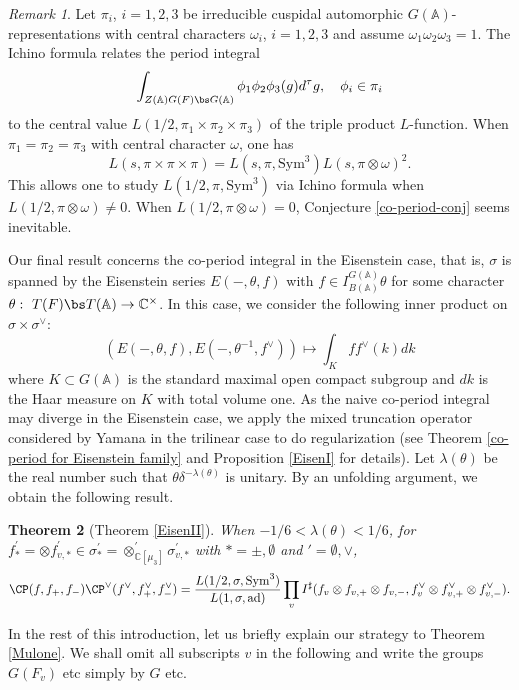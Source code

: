 \documentclass[11pt,reqno]{amsart}
\newcommand{\BA}{{\mathbb {A}}} \newcommand{\BB}{{\mathbb {B}}}
\newcommand{\BC}{{\mathbb {C}}} \newcommand{\BD}{{\mathbb {D}}}
\newcommand{\ad}{{\mathrm{ad}}}\newcommand{\al}{{\mathrm{al}}}
\newcommand{\Sym}{{\mathrm{Sym}}}\newcommand{\sgn}{{\mathrm{sgn}}}
\theoremstyle{plain}
\newtheorem{thm}{Theorem}[section] \newtheorem{cor}[thm]{Corollary}
\theoremstyle{remark} \newtheorem{remark}[thm]{Remark}
\theoremstyle{definition} \newtheorem{exercise}[thm]{Exercise}
\theoremstyle{definition} \newtheorem{example}[thm]{Example} \newtheorem{condition}[thm]{Condition}
\numberwithin{equation}{section}
\renewcommand{\-}{\text{--}}
\begin{document}
\begin{remark}Let $\pi_i$, $i=1,2,3$ be irreducible cuspidal automorphic $G(\BA)$-representations with central
characters $\omega_i$, $i=1,2,3$ and assume $\omega_1\omega_2\omega_3 = 1$. 
The Ichino formula \cite{Ich08} relates the period integral 
\[\int_{Z(\BA)G(F)\bs G(\BA)}\phi_1\phi_2\phi_3(g)d^\tau g,\quad \phi_i\in\pi_i\]
to the central value $L(1/2,\pi_1\times\pi_2\times\pi_3)$ of the triple product $L$-function. When $\pi_1=\pi_2=\pi_3$ with central character $\omega$, one has \[L(s,\pi\times\pi\times\pi)=L(s,\pi,\Sym^3)L(s,\pi\otimes\omega)^2.\] 
This allows one to study $L(1/2,\pi,\Sym^3)$ via Ichino formula when $L(1/2, \pi\otimes\omega)\neq0$. When $L(1/2, \pi\otimes\omega)=0$, Conjecture \ref{co-period-conj} seems inevitable.
\end{remark}
Our final result concerns  the co-period integral in the Eisenstein case, that is, $\sigma$ is spanned by the 
Eisenstein series $E(-,\theta,f)$ with $f\in I_{B(\BA)}^{G(\BA)}\theta$ for some character $\theta:\ T(F)\bs T(\BA)\to\BC^\times$. In this case, 
we consider the following inner product on $\sigma\times\sigma^\vee$:
\[\left(E(-,\theta,f),E(-,\theta^{-1},f^\vee)\right)\mapsto \int_K ff^\vee(k)dk\]
where $K\subset G(\BA)$ is the standard maximal open compact subgroup and $dk$ is the Haar measure on $K$ with total volume one. As the naive co-period integral may diverge in the Eisenstein case, we apply the mixed truncation operator considered by Yamana in the trilinear case \cite{Yam18} to do regularization (see Theorem \ref{co-period for Eisenstein family} and Proposition \ref{EisenI} for details). Let $\lambda(\theta)$  be the real number such that $\theta\delta^{-\lambda(\theta)}$ is unitary. By an unfolding argument, we obtain the following result.
\begin{thm}[Theorem \ref{EisenII}] \label{Eisen} When $-1/6<\lambda(\theta)<1/6$, for $f_*^\prime=\otimes f_{v,*}^\prime\in\sigma_*^\prime=\otimes_{\BC[\mu_3]}^\prime \sigma_{v,*}^\prime $ with $*=\pm,\emptyset$ and $\prime=\emptyset,\vee$, 
\[\CP(f,f_+,f_-)\CP^\vee(f^\vee,f_+^\vee,f_-^\vee)=\frac{L(1/2,\sigma,\Sym^3)}{L(1,\sigma,\ad)}\prod_v I^\sharp(f_v\otimes f_{v,+}\otimes f_{v,-},f_v^\vee\otimes f_{v,+}^\vee\otimes f_{v,-}^\vee).\]
\end{thm}

In the rest of this introduction, let us briefly explain our strategy to Theorem \ref{Mulone}. We shall omit all subscripts $v$ in the following and write the groups $G(F_v)$ etc simply by $G$ etc. 
\end{document}

